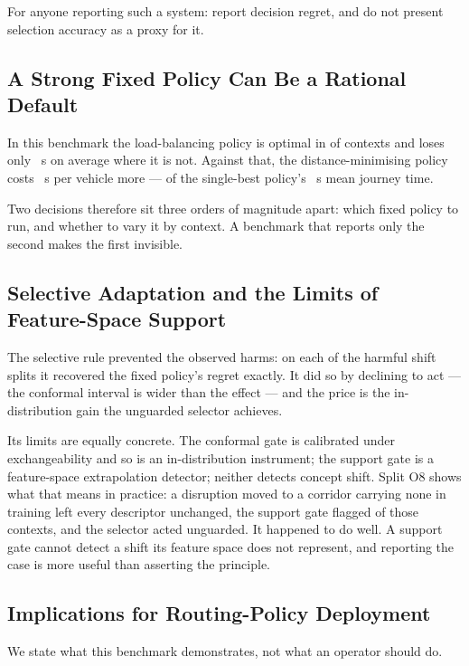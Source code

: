 For anyone reporting such a system: report decision regret, and do not present
selection accuracy as a proxy for it.

\subsection{A Strong Fixed Policy Can Be a Rational Default}

In this benchmark the load-balancing policy is optimal in
\NumSBSOptimalPct{} of contexts and loses only \NumAsymLoss~s on average where
it is not. Against that, the distance-minimising policy costs
\NumFixedPenAbsPOne~s per vehicle more --- \NumFixedPenPctAbsPOne{} of the
single-best policy's \NumSBSMeanCost~s mean journey time.

Two decisions therefore sit three orders of magnitude apart: which fixed policy
to run, and whether to vary it by context. A benchmark that reports only the
second makes the first invisible.

\subsection{Selective Adaptation and the Limits of Feature-Space Support}

The selective rule prevented the observed harms: on each of the
\NumOODNHarms{} harmful shift splits it recovered the fixed policy's regret
exactly. It did so by declining to act --- the conformal interval is wider than
the effect --- and the price is the in-distribution gain the unguarded selector
achieves.

Its limits are equally concrete. The conformal gate is calibrated under
exchangeability and so is an in-distribution instrument; the support gate is a
feature-space extrapolation detector; neither detects concept shift. Split O8
shows what that means in practice: a disruption moved to a corridor carrying
none in training left every descriptor unchanged, the support gate flagged
\NumOODEightNorthSupport{} of those contexts, and the selector acted unguarded.
It happened to do well. A support gate cannot detect a shift its feature space
does not represent, and reporting the case is more useful than asserting the
principle.

\subsection{Implications for Routing-Policy Deployment}

We state what this benchmark demonstrates, not what an operator should do.

